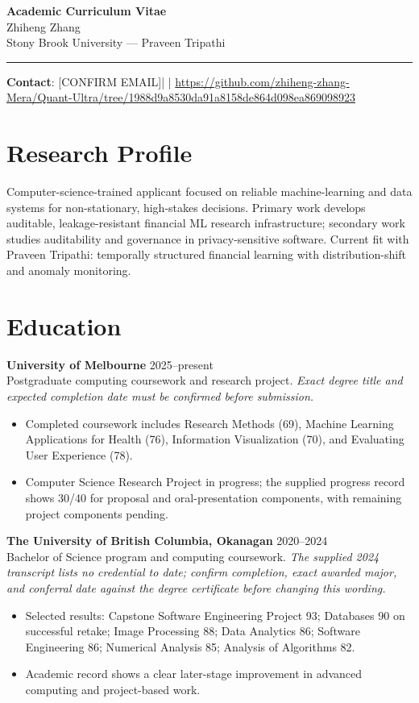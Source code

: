 \documentclass[11pt]{article}
\newcommand{\ApplicantName}{Zhiheng Zhang}
\newcommand{\ApplicantEmail}{[CONFIRM EMAIL]}
\newcommand{\ApplicantPhone}{[CONFIRM PHONE]}
\newcommand{\ApplicantGitHub}{\url{https://github.com/zhiheng-zhang-Mera/Quant-Ultra/tree/1988d9a8530da91a8158de864d098ea869098923}}
\begin{document}
\begin{center}
{\LARGE\bfseries Academic Curriculum Vitae}\\[0.25em]
{\large \ApplicantName}\\
Stony Brook University --- Praveen Tripathi
\end{center}
\vspace{0.35em}\hrule\vspace{0.65em}

\textbf{Contact}: \ApplicantEmail\quad | \quad \ApplicantPhone\quad | \quad \ApplicantGitHub

\section*{Research Profile}
Computer-science-trained applicant focused on reliable machine-learning and data systems for non-stationary, high-stakes decisions. Primary work develops auditable, leakage-resistant financial ML research infrastructure; secondary work studies auditability and governance in privacy-sensitive software. Current fit with Praveen Tripathi: temporally structured financial learning with distribution-shift and anomaly monitoring.

\section*{Education}
\textbf{University of Melbourne} \hfill 2025--present\\
Postgraduate computing coursework and research project. \textit{Exact degree title and expected completion date must be confirmed before submission.}
\begin{itemize}
\item Completed coursework includes Research Methods (69), Machine Learning Applications for Health (76), Information Visualization (70), and Evaluating User Experience (78).
\item Computer Science Research Project in progress; the supplied progress record shows 30/40 for proposal and oral-presentation components, with remaining project components pending.
\end{itemize}

\textbf{The University of British Columbia, Okanagan} \hfill 2020--2024\\
Bachelor of Science program and computing coursework. \textit{The supplied 2024 transcript lists no credential to date; confirm completion, exact awarded major, and conferral date against the degree certificate before changing this wording.}
\begin{itemize}
\item Selected results: Capstone Software Engineering Project 93; Databases 90 on successful retake; Image Processing 88; Data Analytics 86; Software Engineering 86; Numerical Analysis 85; Analysis of Algorithms 82.
\item Academic record shows a clear later-stage improvement in advanced computing and project-based work.
\end{itemize}
\end{document}
